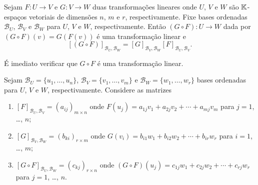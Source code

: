 \begin{teorema}\label{matriz_da_composicao_de_transformacoes}
  Sejam $F : U \to V$ e $G : V \to W$ duas transforma\c{c}\~oes lineares onde $U$, $V$ e $W$ s\~ao $\mathbb{K}$-espa\c{c}os vetoriais de dimens\~oes $n$, $m$ e $r$, respectivamente. Fixe bases ordenadas $\mathcal{B}_U$, $\mathcal{B}_V$ e $\mathcal{B}_W$ para $U$, $V$ e $W$, respectivamente. Ent\~ao $(G \circ F) : U \to W$ dada por $(G\circ F)(v) = G(F(v))$ \'e uma transforma\c{c}\~ao linear e
  \[
    [(G \circ F)]_{{\mathcal{B}_U},{\mathcal{B}_W}} = [G]_{{\mathcal{B}_V},{\mathcal{B}_W}}[F]_{{\mathcal{B}_U},{\mathcal{B}_V}}.
  \]
\end{teorema}
\begin{prova}
  \'E imediato verificar que $G\circ F$ \'e uma transforma\c{c}\~ao linear.

  Sejam $\mathcal{B}_U = \{u_1,\dots,u_n\}$, $\mathcal{B}_V = \{v_1,\dots,v_m\}$ e $\mathcal{B}_W = \{w_1,\dots,w_r\}$ bases ordenadas para $U$, $V$ e $W$, respectivamente. Considere as matrizes
  \begin{enumerate}[label=({\arabic*})]
    \item $[F]_{{\mathcal{B}_U},{\mathcal{B}_V}} = (a_{ij})_{m\times n}$ onde $F(u_j) = a_{1j}v_1 + a_{2j}v_2 + \cdots + a_{mj}v_m$ para $j=1$, \dots, $n$;

    \item $[G]_{{\mathcal{B}_V},{\mathcal{B}_W}} = (b_{ki})_{r\times m}$ onde $G(v_i) = b_{i1}w_1 + b_{i2}w_2 + \cdots + b_{ir}w_r$ para $i=1$, \dots, $m$;

    \item $[G \circ F]_{{\mathcal{B}_U},{\mathcal{B}_W}} = (c_{kj})_{r\times n}$ onde $(G\circ F)(u_j) = c_{1j}w_1 + c_{2j}w_2 + \cdots + c_{rj}w_r$ para $j=1$, \dots, $n$.
  \end{enumerate}


\end{prova}
